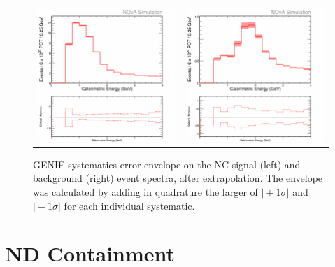 \begin{figure}[htb]
  \centering
  \begin{tabular}{c c}
    \includegraphics[width=.47\textwidth]{figures/Systs/cNCEXGENIESysts.png} &
    \includegraphics[width=.47\linewidth]{figures/Systs/cBGEXGENIESysts.png} \\
  \end{tabular}
  \caption[GENIE Systematic Error Envelopes]{GENIE systematics error envelope on the NC signal (left) and background (right) event spectra, after extrapolation. The envelope was calculated by adding in quadrature the larger of $\vert +1\sigma \vert$ and $\vert -1\sigma \vert$ for each individual systematic.}
  \label{fig:SystGENIE}
\end{figure}

\section{ND Containment}
\label{sec:SystNDCont}

